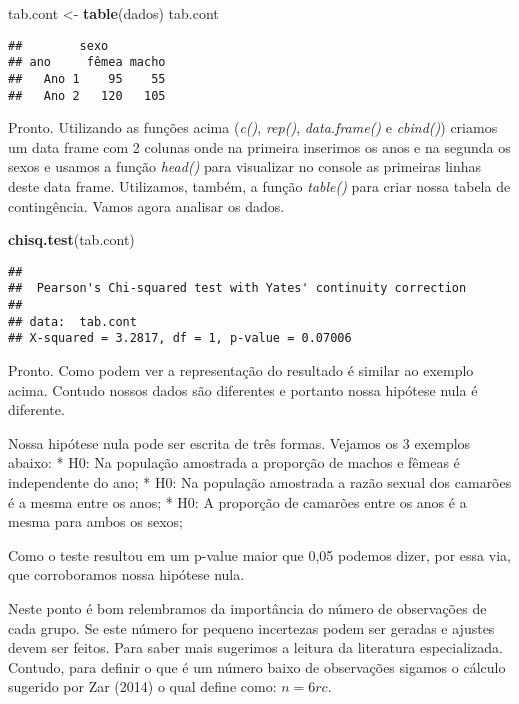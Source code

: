 \documentclass[]{book}
\newenvironment{Shaded}{\begin{snugshade}}{\end{snugshade}}
\newcommand{\KeywordTok}[1]{\textcolor[rgb]{0.13,0.29,0.53}{\textbf{#1}}}
\newcommand{\NormalTok}[1]{#1}
\newcommand{\StringTok}[1]{\textcolor[rgb]{0.31,0.60,0.02}{#1}}
\begin{document}
\begin{Shaded}
\begin{Highlighting}[]
\NormalTok{tab.cont <-}\StringTok{ }\KeywordTok{table}\NormalTok{(dados)}
\NormalTok{tab.cont}
\end{Highlighting}
\end{Shaded}

\begin{verbatim}
##        sexo
## ano     fêmea macho
##   Ano 1    95    55
##   Ano 2   120   105
\end{verbatim}

Pronto. Utilizando as funções acima (\emph{c()}, \emph{rep()}, \emph{data.frame()} e \emph{cbind()}) criamos um data frame com 2 colunas onde na primeira inserimos os anos e na segunda os sexos e usamos a função \emph{head()} para visualizar no console as primeiras linhas deste data frame. Utilizamos, também, a função \emph{table()} para criar nossa tabela de contingência. Vamos agora analisar os dados.

\begin{Shaded}
\begin{Highlighting}[]
\KeywordTok{chisq.test}\NormalTok{(tab.cont)}
\end{Highlighting}
\end{Shaded}

\begin{verbatim}
## 
##  Pearson's Chi-squared test with Yates' continuity correction
## 
## data:  tab.cont
## X-squared = 3.2817, df = 1, p-value = 0.07006
\end{verbatim}

Pronto. Como podem ver a representação do resultado é similar ao exemplo acima. Contudo nossos dados são diferentes e portanto nossa hipótese nula é diferente.

Nossa hipótese nula pode ser escrita de três formas. Vejamos os 3 exemplos abaixo:
* H0: Na população amostrada a proporção de machos e fêmeas é independente do ano;
* H0: Na população amostrada a razão sexual dos camarões é a mesma entre os anos;
* H0: A proporção de camarões entre os anos é a mesma para ambos os sexos;

Como o teste resultou em um p-value maior que 0,05 podemos dizer, por essa via, que corroboramos nossa hipótese nula.

Neste ponto é bom relembramos da importância do número de observações de cada grupo. Se este número for pequeno incertezas podem ser geradas e ajustes devem ser feitos. Para saber mais sugerimos a leitura da literatura especializada. Contudo, para definir o que é um número baixo de observações sigamos o cálculo sugerido por Zar (2014) o qual define como: \(n = 6rc\).
\end{document}

